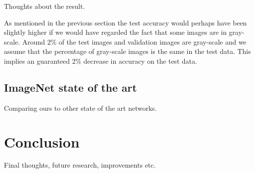 \documentclass{kthreport}
\begin{document}
Thoughts about the result.

As mentioned in the previous section the test accuracy would perhaps have been slightly higher if we would have regarded the fact that some images are in gray-scale. Around 2\% of the test images and validation images are gray-scale and we assume that the percentage of gray-scale images is the same in the test data. This implies an guaranteed 2\% decrease in accuracy on the test data. 

\subsection{ImageNet state of the art}

Comparing ours to other state of the art networks.

\section{Conclusion}
Final thoughts, future research, improvements etc.

{}

\end{document}
